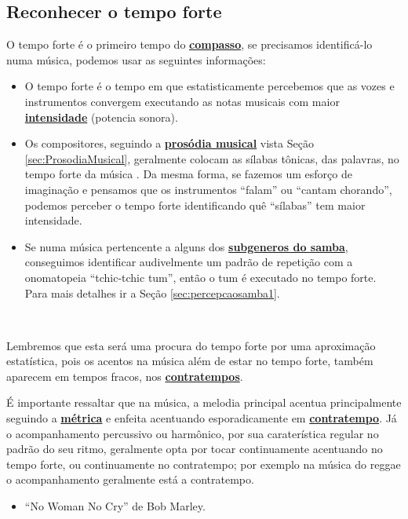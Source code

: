 \subsection{Reconhecer o tempo forte}
\label{subsec:perceberTF1}
O tempo forte é o primeiro tempo do \hyperref[def:Compasso]{\textbf{compasso}},
se precisamos identificá-lo numa música, podemos usar as seguintes informações:
\begin{itemize}
\item O tempo forte é o tempo em que estatisticamente percebemos que as vozes e 
instrumentos convergem executando as notas musicais com maior  \hyperref[sec:pos:Intensidade]{\textbf{intensidade}}  (potencia sonora). 
\item Os compositores, seguindo a \hyperref[sec:ProsodiaMusical]{\textbf{prosódia musical}} vista Seção \ref{sec:ProsodiaMusical}, 
geralmente colocam as sílabas tônicas, das palavras, no tempo forte da música  \cite[pp. 149]{medteoria}. 
Da mesma forma, se fazemos um esforço de imaginação e pensamos que os instrumentos ``falam'' ou ``cantam chorando'',
podemos perceber o tempo forte identificando quê ``sílabas'' tem maior intensidade.
\item Se numa música pertencente a alguns dos \hyperref[sec:FamiliaSamba]{\textbf{subgeneros do samba}}, 
conseguimos identificar audivelmente  um padrão de repetição com a onomatopeia ``tchic-tchic tum'', 
então o tum é executado no tempo forte. 
Para mais detalhes ir a Seção \ref{sec:percepcaosamba1}.
\end{itemize}~

Lembremos que esta será uma procura do tempo forte por uma aproximação estatística, 
pois os acentos na música além de estar no tempo forte, 
também aparecem em tempos fracos, nos \hyperref[sec:contratempo]{\textbf{contratempos}}.


\begin{tcbattention}
É importante ressaltar que na música, 
a melodia principal acentua principalmente seguindo a \hyperref[def:acentometrico]{\textbf{métrica}}
e enfeita acentuando esporadicamente em \hyperref[sec:contratempo]{\textbf{contratempo}}.
Já o acompanhamento percussivo ou harmônico, por sua caraterística regular no padrão do seu ritmo,
geralmente opta por tocar continuamente acentuando no tempo forte,
ou continuamente no contratempo; 
por exemplo na música do reggae o acompanhamento geralmente está a contratempo.
\begin{itemize}
\item ``No Woman No Cry'' de Bob Marley.
\end{itemize}
\end{tcbattention}


